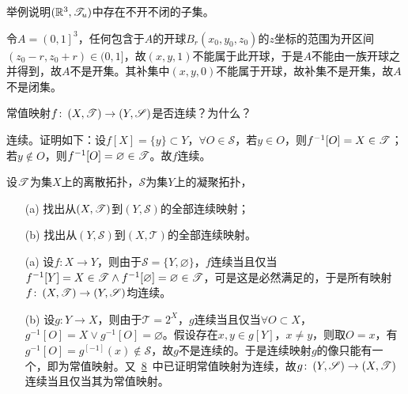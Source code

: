 \begin{xiti}
	\item 举例说明$(\mathbb{R}^3,\mathscr{T}_u)$中存在不开不闭的子集。

	\begin{jie}
		令$A=\left(0,1 \right]^3 $，任何包含于$A$的开球$B_{r}(x_0,y_0,z_0) $的$z$坐标的范围为开区间$(z_0-r,z_0+r)\in (0,1]$，故$(x,y,1)$不能属于此开球，于是$A$不能由一族开球之并得到，故$A$不是开集。其补集中$(x,y,0)$不能属于开球，故补集不是开集，故$A$不是闭集。
	\end{jie}

	\item \hypertarget{1.8}{} 常值映射$f\colon \left(X,\mathscr{T}\right)\rightarrow\left(Y,\mathscr{S}\right) $是否连续？为什么？

	\begin{jie}
		连续。证明如下：设$f[X]=\{y\}\subset Y$，$\forall O\in \mathscr{S} $，若$y\in O$，则$f^{-1}[O]=X\in \mathscr{T}$；若$y\notin O$，则$f^{-1}[O]=\varnothing \in\mathscr{T} $。故$f$连续。
	\end{jie}

	\item 设$\mathscr{T}$为集$X$上的离散拓扑，$\mathscr{S}$为集$Y$上的凝聚拓扑，
	\begin{enumerate}
		\item[(a)] 找出从$\left(X,\mathscr{T}\right)$到$\left(Y,\mathscr{S}\right)$的全部连续映射；
		\item[(b)] 找出从$\left(Y,\mathscr{S}\right)$到$\left(X,\mathscr{T}\right)$的全部连续映射。
	\end{enumerate}

	\begin{jie}
		\begin{enumerate}
			\item[(a)] 设$f\colon X\rightarrow Y$，则由于$\mathscr{S}=\{Y,\varnothing\}$，$f$连续当且仅当$f^{-1}[Y]=X\in \mathscr{T} \wedge f^{-1}[\varnothing]=\varnothing\in \mathscr{T}$，可是这是必然满足的，于是所有映射$f\colon \left(X,\mathscr{T}\right)\rightarrow\left(Y,\mathscr{S}\right) $均连续。
			\item[(b)] 设$g\colon Y\rightarrow X$，则由于$\mathscr{T}=2^X$，$g$连续当且仅当$\forall O\subset X $，$g^{-1}[O]=X \vee g^{-1}[O]=\varnothing $。假设存在$x,y\in g[Y]$，$x\neq y$，则取$O={x} $，有$g^{-1}[O]=g^[-1](x)\notin \mathscr{S} $，故$g$不是连续的。于是连续映射$g$的像只能有一个，即为常值映射。又~\hyperlink{1.8}{8}~中已证明常值映射为连续，故$g\colon \left(Y,\mathscr{S}\right)\rightarrow\left(X,\mathscr{T}\right) $连续当且仅当其为常值映射。
		\end{enumerate}
	\end{jie}


\end{xiti}
